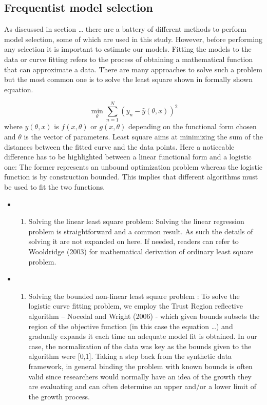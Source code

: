 \documentclass[]{article}
\providecommand{\tightlist}{%
  \setlength{\itemsep}{0pt}\setlength{\parskip}{0pt}}
\begin{document}
\hypertarget{frequentist-model-selection}{%
\subsection{Frequentist model
selection}\label{frequentist-model-selection}}

As discussed in section \ldots{} there are a battery of different
methods to perform model selection, some of which are used in this
study. However, before performing any selection it is important to
estimate our models. Fitting the models to the data or curve fitting
refers to the process of obtaining a mathematical function that can
approximate a data. There are many approaches to solve such a problem
but the most common one is to solve the least square shown in formally
shown equation.

\[\min_{\theta} \sum_{n=1}^{N} (y_n - \hat y(\theta,x))^2\] where
\(y(\theta,x)\) is \(f(x, \theta)\) or \(g(x, \theta)\) depending on the
functional form chosen and \(\theta\) is the vector of parameters. Least
square aims at minimizing the sum of the distances between the fitted
curve and the data points. Here a noticeable difference has to be
highlighted between a linear functional form and a logistic one: The
former represents an unbound optimization problem whereas the logistic
function is by construction bounded. This implies that different
algorithms must be used to fit the two functions.

\begin{itemize}
\item
  \begin{enumerate}
  \def\labelenumi{(\roman{enumi})}
  \tightlist
  \item
    Solving the linear least square problem: Solving the linear
    regression problem is straightforward and a common result. As such
    the details of solving it are not expanded on here. If needed,
    readers can refer to Wooldridge (2003) for mathematical derivation
    of ordinary least square problem.
  \end{enumerate}
\item
  \begin{enumerate}
  \def\labelenumi{(\roman{enumi})}
  \setcounter{enumi}{1}
  \tightlist
  \item
    Solving the bounded non-linear least square problem : To solve the
    logistic curve fitting problem, we employ the Trust Region
    reflective algorithm -- Nocedal and Wright (2006) - which given
    bounds subsets the region of the objective function (in this case
    the equation \ldots{}) and gradually expands it each time an
    adequate model fit is obtained. In our case, the normalization of
    the data was key as the bounds given to the algorithm were
    {[}0,1{]}. Taking a step back from the synthetic data framework, in
    general binding the problem with known bounds is often valid since
    researchers would normally have an idea of the growth they are
    evaluating and can often determine an upper and/or a lower limit of
    the growth process.
  \end{enumerate}
\end{itemize}
\end{document}
